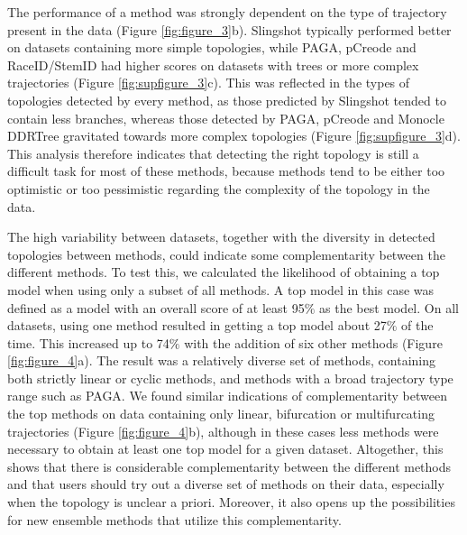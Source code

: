 The performance of a method was strongly dependent on the type of trajectory present in the data (Figure \ref{fig:figure_3}b). Slingshot typically performed better on datasets containing more simple topologies, while PAGA, pCreode and RaceID/StemID had higher scores on datasets with trees or more complex trajectories (Figure \ref{fig:supfigure_3}c). This was reflected in the types of topologies detected by every method, as those predicted by Slingshot tended to contain less branches, whereas those detected by PAGA, pCreode and Monocle DDRTree gravitated towards more complex topologies (Figure \ref{fig:supfigure_3}d). This analysis therefore indicates that detecting the right topology is still a difficult task for most of these methods, because methods tend to be either too optimistic or too pessimistic regarding the complexity of the topology in the data.

The high variability between datasets, together with the diversity in detected topologies between methods, could indicate some complementarity between the different methods. To test this, we calculated the likelihood of obtaining a top model when using only a subset of all methods. A top model in this case was defined as a model with an overall score of at least 95$\%$ as the best model. On all datasets, using one method resulted in getting a top model about 27$\%$ of the time. This increased up to 74$\%$ with the addition of six other methods (Figure \ref{fig:figure_4}a). The result was a relatively diverse set of methods, containing both strictly linear or cyclic methods, and methods with a broad trajectory type range such as PAGA. We found similar indications of complementarity between the top methods on data containing only linear, bifurcation or multifurcating trajectories (Figure \ref{fig:figure_4}b), although in these cases less methods were necessary to obtain at least one top model for a given dataset. Altogether, this shows that there is considerable complementarity between the different methods and that users should try out a diverse set of methods on their data, especially when the topology is unclear a priori. Moreover, it also opens up the possibilities for new ensemble methods that utilize this complementarity.


